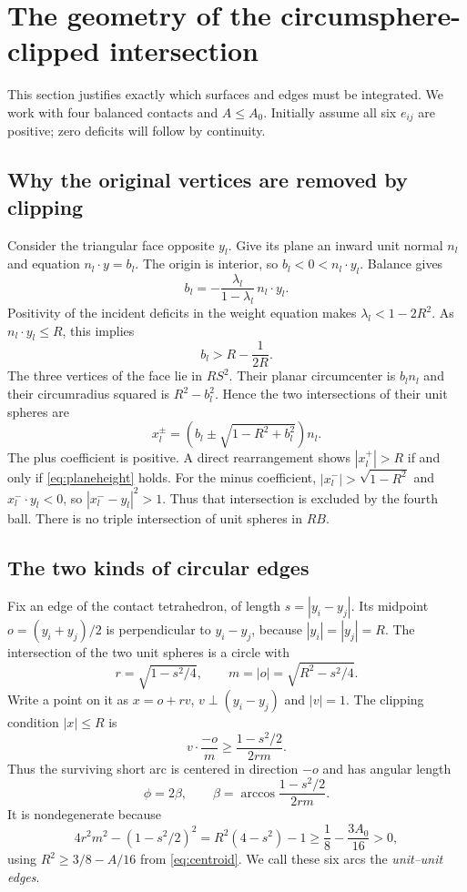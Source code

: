 \documentclass[11pt]{article}
\numberwithin{equation}{section}
\theoremstyle{definition}\newtheorem{definition}[theorem]{Definition}
\theoremstyle{remark}\newtheorem{remark}[theorem]{Remark}
\begin{document}
\section{The geometry of the circumsphere-clipped intersection}\label{sec:clipgeometry}
This section justifies exactly which surfaces and edges must be integrated.
We work with four balanced contacts and $A\le A_0$. Initially assume all
six $e_{ij}$ are positive; zero deficits will follow by continuity.

\subsection{Why the original vertices are removed by clipping}
Consider the triangular face opposite $y_l$. Give its plane an inward unit
normal $n_l$ and equation $n_l\cdot y=b_l$. The origin is interior, so
$b_l<0<n_l\cdot y_l$. Balance gives
\[
 b_l=-\frac{\lambda_l}{1-\lambda_l}\,n_l\cdot y_l.
\]
Positivity of the incident deficits in the weight equation makes
$\lambda_l<1-2R^2$. As $n_l\cdot y_l\le R$, this implies
\begin{equation}\label{eq:planeheight}
 b_l>R-\frac1{2R}.
\end{equation}
The three vertices of the face lie in $RS^2$. Their planar circumcenter is
$b_ln_l$ and their circumradius squared is $R^2-b_l^2$. Hence the two
intersections of their unit spheres are
\[
 x_l^\pm=\left(b_l\pm\sqrt{1-R^2+b_l^2}\right)n_l.
\]
The plus coefficient is positive. A direct rearrangement shows
$|x_l^+|>R$ if and only if \cref{eq:planeheight} holds. For the minus
coefficient, $|x_l^-|>\sqrt{1-R^2}$ and $x_l^-\cdot y_l<0$, so
$|x_l^--y_l|^2>1$. Thus that intersection is excluded by the fourth ball.
There is no triple intersection of unit spheres in $RB$.

\subsection{The two kinds of circular edges}
Fix an edge of the contact tetrahedron, of length $s=|y_i-y_j|$. Its midpoint
$o=(y_i+y_j)/2$ is perpendicular to $y_i-y_j$, because $|y_i|=|y_j|=R$.
The intersection of the two unit spheres is a circle with
\begin{equation}\label{eq:loadingcircle}
 r=\sqrt{1-s^2/4},\qquad m=|o|=\sqrt{R^2-s^2/4}.
\end{equation}
Write a point on it as $x=o+r v$, $v\perp(y_i-y_j)$ and $|v|=1$.
The clipping condition $|x|\le R$ is
\[
 v\cdot\frac{-o}{m}\ge\frac{1-s^2/2}{2rm}.
\]
Thus the surviving short arc is centered in direction $-o$ and has angular
length
\begin{equation}\label{eq:phi}
 \phi=2\beta,\qquad
 \beta=\arccos\frac{1-s^2/2}{2rm}.
\end{equation}
It is nondegenerate because
\[
 4r^2m^2-(1-s^2/2)^2=R^2(4-s^2)-1
 \ge\frac18-\frac{3A_0}{16}>0,
\]
using $R^2\ge3/8-A/16$ from \cref{eq:centroid}. We call these six arcs the
\emph{unit--unit edges}.
\end{document}
